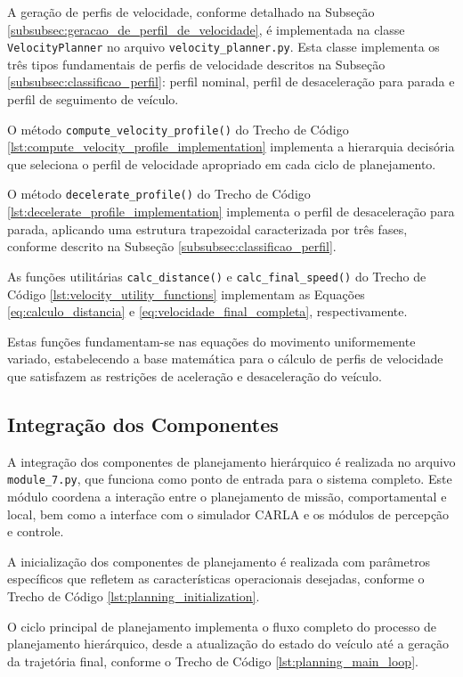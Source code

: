 A geração de perfis de velocidade, conforme detalhado na Subseção \ref{subsubsec:geracao_de_perfil_de_velocidade}, é implementada na classe \texttt{VelocityPlanner} no arquivo \texttt{velocity\_planner.py}. Esta classe implementa os três tipos fundamentais de perfis de velocidade descritos na Subseção \ref{subsubsec:classificao_perfil}: perfil nominal, perfil de desaceleração para parada e perfil de seguimento de veículo.

O método \texttt{compute\_velocity\_profile()} do Trecho de Código \ref{lst:compute_velocity_profile_implementation} implementa a hierarquia decisória que seleciona o perfil de velocidade apropriado em cada ciclo de planejamento.

O método \texttt{decelerate\_profile()} do Trecho de Código \ref{lst:decelerate_profile_implementation} implementa o perfil de desaceleração para parada, aplicando uma estrutura trapezoidal caracterizada por três fases, conforme descrito na Subseção \ref{subsubsec:classificao_perfil}.

As funções utilitárias \texttt{calc\_distance()} e \texttt{calc\_final\_speed()} do Trecho de Código \ref{lst:velocity_utility_functions} implementam as Equações \ref{eq:calculo_distancia} e \ref{eq:velocidade_final_completa}, respectivamente.

Estas funções fundamentam-se nas equações do movimento uniformemente variado, estabelecendo a base matemática para o cálculo de perfis de velocidade que satisfazem as restrições de aceleração e desaceleração do veículo.

\subsection{Integração dos Componentes} \label{subsec:integracao_componentes}

A integração dos componentes de planejamento hierárquico é realizada no arquivo \texttt{module\_7.py}, que funciona como ponto de entrada para o sistema completo. Este módulo coordena a interação entre o planejamento de missão, comportamental e local, bem como a interface com o simulador CARLA e os módulos de percepção e controle.

A inicialização dos componentes de planejamento é realizada com parâmetros específicos que refletem as características operacionais desejadas, conforme o Trecho de Código \ref{lst:planning_initialization}.

O ciclo principal de planejamento implementa o fluxo completo do processo de planejamento hierárquico, desde a atualização do estado do veículo até a geração da trajetória final, conforme o Trecho de Código \ref{lst:planning_main_loop}.

